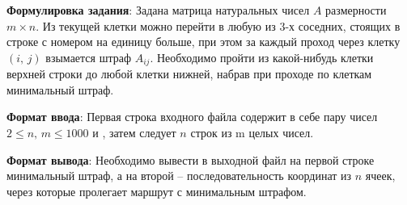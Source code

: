 
\textbf{Формулировка задания}: Задана матрица натуральных чисел $A$ размерности $m \times n$. Из текущей клетки можно перейти в любую из 3-х соседних, стоящих в строке с номером на единицу больше, при этом за каждый проход через клетку $(i, \, j)$ взымается штраф $A_{ij}$. Необходимо пройти из какой-нибудь клетки верхней строки до любой клетки нижней, набрав при проходе по клеткам минимальный штраф. 

\par

\textbf{Формат ввода}: Первая строка входного файла содержит в себе пару чисел $2 \leq n, \, m \leq 1000$ и , затем следует $n$ строк из m целых чисел. 

\textbf{Формат вывода}: Необходимо вывести в выходной файл на первой строке минимальный штраф, а на второй – последовательность координат из $n$ ячеек, через которые пролегает маршрут с минимальным штрафом. 

\pagebreak
